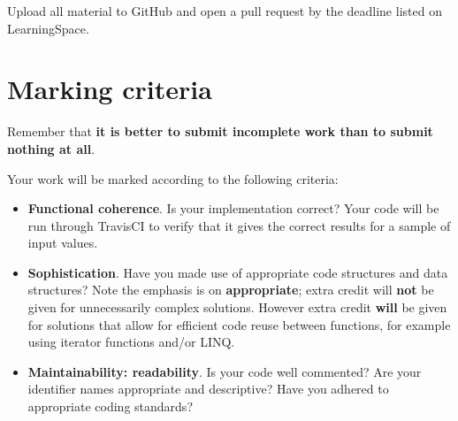 \documentclass{../../../fal_assignment}
\begin{document}
Upload all material to GitHub and open a pull request by the deadline listed on LearningSpace.

\section*{Marking criteria}

Remember that \textbf{it is better to submit incomplete work than to submit nothing at all}.

Your work will be marked according to the following criteria:
\begin{itemize}
	\item \textbf{Functional coherence}. Is your implementation correct?
		Your code will be run through TravisCI to verify that it gives the correct results for a sample of input values.
	\item \textbf{Sophistication}. Have you made use of appropriate code structures and data structures?
		Note the emphasis is on \textbf{appropriate}; extra credit will \textbf{not} be given for unnecessarily complex solutions.
		However extra credit \textbf{will} be given for solutions that allow for efficient code reuse between functions,
		for example using iterator functions and/or LINQ.
	\item \textbf{Maintainability: readability}. Is your code well commented? Are your identifier names appropriate and descriptive?
		Have you adhered to appropriate coding standards?
\end{itemize}
\end{document}
